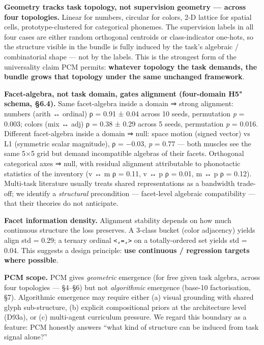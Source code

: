 \textbf{Geometry tracks task topology, not supervision geometry --- across
four topologies.} Linear for numbers, circular for colors, 2-D
lattice for spatial cells, prototype-clustered for categorical
phonemes. The supervision labels in all four cases are either random
orthogonal centroids or class-indicator one-hots, so the structure
visible in the bundle is fully induced by the task's algebraic /
combinatorial shape --- not by the labels. This is the strongest form
of the universality claim PCM permits: \textbf{whatever topology the task
demands, the bundle grows that topology under the same unchanged
framework}.

\textbf{Facet-algebra, not task domain, gates alignment (four-domain H5"
schema, §6.4).} Same facet-algebra inside a domain ⇒ strong
alignment: numbers (arith ↔ ordinal) ρ = 0.91 ± 0.04 across 10
seeds, permutation \emph{p} = 0.003; colors (mix ↔ adj) ρ = 0.38 ± 0.29
across 5 seeds, permutation \emph{p} = 0.016. Different facet-algebra
inside a domain ⇒ null: space motion (signed vector) vs L1
(symmetric scalar magnitude), ρ = −0.03, \emph{p} = 0.77 --- both muscles
see the same 5×5 grid but demand incompatible algebras of their
facets. Orthogonal categorical axes ⇒ null, with residual alignment
attributable to phonotactic statistics of the inventory (v ↔ m
\textbar ρ\textbar{} = 0.11, v ↔ p \textbar ρ\textbar{} = 0.01, m ↔ p \textbar ρ\textbar{} = 0.12). Multi-task
literature usually treats shared representations as a bandwidth
trade-off; we identify a \emph{structural} precondition --- facet-level
algebraic compatibility --- that their theories do not anticipate.

\textbf{Facet information density.} Alignment stability depends on how much
continuous structure the loss preserves. A 3-class bucket (color
adjacency) yields align std = 0.29; a ternary ordinal \texttt{\textless{},=,\textgreater{}} on a
totally-ordered set yields std = 0.04. This suggests a design
principle: \textbf{use continuous / regression targets where possible}.

\textbf{PCM scope.} PCM gives \emph{geometric} emergence (for free given task
algebra, across four topologies --- §4--§6) but not \emph{algorithmic}
emergence (base-10 factorisation, §7). Algorithmic emergence may
require either (a) visual grounding with shared glyph sub-structure,
(b) explicit compositional priors at the architecture level (D93a),
or (c) multi-agent curriculum pressure. We regard this boundary as a
feature: PCM honestly answers ``what kind of structure can be induced
from task signal alone?''


